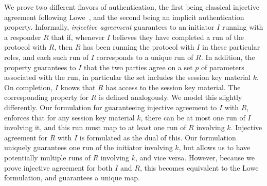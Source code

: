 \label{sec:authenticationDef}
We prove two different flavors of authentication, the first being classical
injective agreement following Lowe~\cite{DBLP:conf/csfw/Lowe97a}, and the second
being an implicit authentication property.
%
Informally, \emph{injective agreement} guarantees to an initiator $I$
running with a responder $R$
that if, whenever $I$ believes they have completed a run of the protocol with $R$,
then $R$ has been running the protocol with $I$ in these particular
roles, and each such run of $I$ corresponds to a unique run of $R$.
%
In addition, the property guarantees to $I$ that the two parties agree on a set
$p$ of parameters associated with the run, in particular the set includes the
session key material $k$.
%
On completion, $I$ knows that $R$ has access to the session key material.
%
The corresponding property for $R$ is defined analogously.
%
We model this slightly differently.
%
%
Our formulation for guaranteeing injective agreement to $I$ with $R$, enforces
that for any session key material $k$, there can be at most one run of $I$
involving it, and this run must map to at least one run of $R$ involving $k$.
%
Injective agreement for $R$ with $I$ is formulated as the dual of this.
%
Our formulation uniquely guarantees one run of the initiator involving $k$,
but allows us to have potentially multiple runs of $R$ involving $k$, and vice
versa.
%
However, because we prove injective agreement for both $I$ and $R$, this
becomes equivalent to the Lowe formulation, and guarantees a unique map.
%


